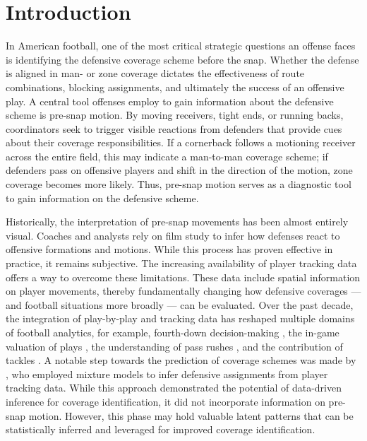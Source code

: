 \documentclass[namedate,webpdf,modern,medium]{oup-authoring-template}
\begin{document}

\maketitle

\section{Introduction}

In American football, one of the most critical strategic questions an offense faces is identifying the defensive coverage scheme before the snap. Whether the defense is aligned in man- or zone coverage dictates the effectiveness of route combinations, blocking assignments, and ultimately the success of an offensive play. A central tool offenses employ to gain information about the defensive scheme is pre-snap motion. By moving receivers, tight ends, or running backs, coordinators seek to trigger visible reactions from defenders that provide cues about their coverage responsibilities. If a cornerback follows a motioning receiver across the entire field, this may indicate a man-to-man coverage scheme; if defenders pass on offensive players and shift in the direction of the motion, zone coverage becomes more likely. Thus, pre-snap motion serves as a diagnostic tool to gain information on the defensive scheme.

Historically, the interpretation of pre-snap movements has been almost entirely visual. Coaches and analysts rely on film study to infer how defenses react to offensive formations and motions. While this process has proven effective in practice, it remains subjective.
The increasing availability of player tracking data offers a way to overcome these limitations. These data include spatial information on player movements, thereby fundamentally changing how defensive coverages --- and football situations more broadly --- can be evaluated. 
Over the past decade, the integration of play-by-play and tracking data has reshaped multiple domains of football analytics, for example, fourth-down decision-making \citep{sandholtz2024learning, brill2025analytics}, the in-game valuation of plays \citep{yurko}, the understanding of pass rushes \citep{nguyen}, and the contribution of tackles \citep{bajons2025pep}. A notable step towards the prediction of coverage schemes was made by \citet{dutta2020unsupervised}, who employed mixture models to infer defensive assignments from player tracking data. While this approach demonstrated the potential of data-driven inference for coverage identification, it did not incorporate information on pre-snap motion. However, this phase may hold valuable latent patterns that can be statistically inferred and leveraged for improved coverage identification.
\end{document}
